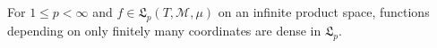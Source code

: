 For $1 \leq p < \infty$ and $f \in \mathfrak{L}_p(T, \mathcal{M}, \mu)$ on an infinite product space, functions depending on only finitely many coordinates are dense in $\mathfrak{L}_p$.
